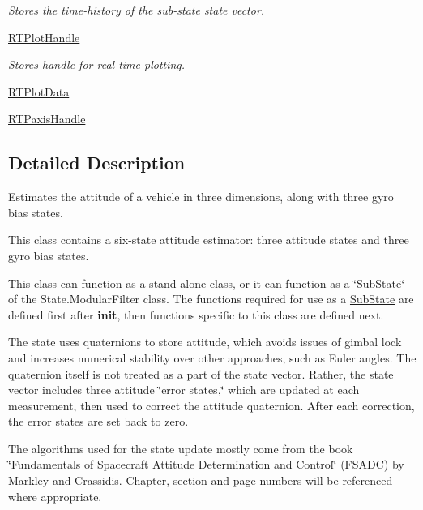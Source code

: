 \begin{DoxyCompactItemize}
\begin{DoxyCompactList}\small\item\em Stores the time-\/history of the sub-\/state state vector. \end{DoxyCompactList}\item 
\hyperlink{classmodest_1_1substates_1_1SubState_1_1SubState_a28d5d778050affd247711bab8b126e80}{R\+T\+Plot\+Handle}
\begin{DoxyCompactList}\small\item\em Stores handle for real-\/time plotting. \end{DoxyCompactList}\item 
\hyperlink{classmodest_1_1substates_1_1SubState_1_1SubState_a7f639244937fbae85f58ac478b0528c0}{R\+T\+Plot\+Data}
\item 
\hyperlink{classmodest_1_1substates_1_1SubState_1_1SubState_a914ef37afe2f8ab5c2ee9a6f4d898553}{R\+T\+Paxis\+Handle}
\end{DoxyCompactItemize}


\subsection{Detailed Description}
Estimates the attitude of a vehicle in three dimensions, along with three gyro bias states. 

This class contains a six-\/state attitude estimator\+: three attitude states and three gyro bias states.

This class can function as a stand-\/alone class, or it can function as a \char`\"{}\+Sub\+State\char`\"{} of the State.\+Modular\+Filter class. The functions required for use as a \hyperlink{namespacemodest_1_1substates_1_1SubState}{Sub\+State} are defined first after {\bfseries init}, then functions specific to this class are defined next.

The state uses quaternions to store attitude, which avoids issues of gimbal lock and increases numerical stability over other approaches, such as Euler angles. The quaternion itself is not treated as a part of the state vector. Rather, the state vector includes three attitude \char`\"{}error states,\char`\"{} which are updated at each measurement, then used to correct the attitude quaternion. After each correction, the error states are set back to zero.

The algorithms used for the state update mostly come from the book \char`\"{}\+Fundamentals of Spacecraft Attitude Determination and Control\char`\"{} (F\+S\+A\+DC) by Markley and Crassidis. Chapter, section and page numbers will be referenced where appropriate. 

